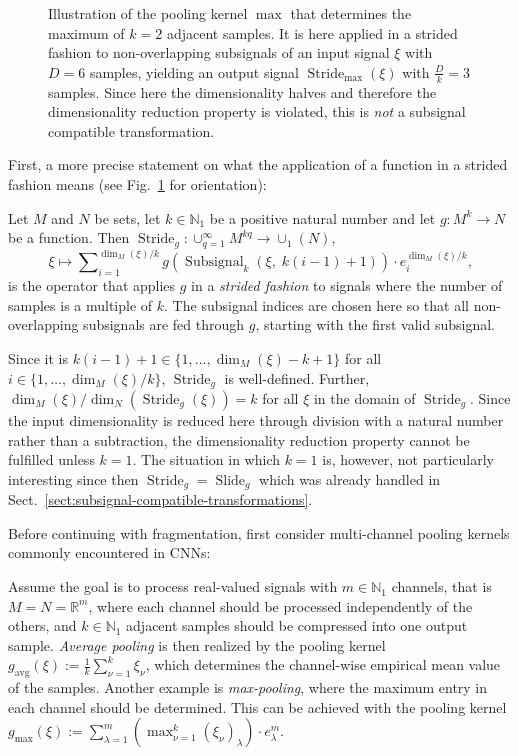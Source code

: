 \documentclass[journal]{IEEEtran}
\newcommand{\figurescalefactor}{0.995}
\newcommand{\N}{\mathbb{N}}
\newcommand{\R}{\mathbb{R}}
\newcommand{\discint}[2]{\{#1,\dotsc,#2\}}
\newcommand{\inint}[2]{\in\discint{#1}{#2}}
\DeclareMathOperator{\avg}{avg}
\DeclareMathOperator{\Subsignal}{Subsignal}
\DeclareMathOperator{\Slide}{Slide}
\DeclareMathOperator{\Stride}{Stride}
\begin{document}
\begin{figure}[t]
  \centering
  \scalebox{\figurescalefactor}{\texttt{[image: paper-pics.pdf]}}
  \caption{Illustration of the pooling kernel $\max$ that determines the maximum of $k = 2$ adjacent samples.
    It is here applied in a strided fashion to non-overlapping subsignals of an input signal $\xi$ with $D = 6$ samples, yielding an output signal $\Stride_{\max}(\xi)$ with $\frac{D}{k} = 3$ samples.
    Since here the dimensionality halves and therefore the dimensionality reduction property is violated, this is \emph{not} a subsignal compatible transformation.}
  \label{fig:strided-function}
\end{figure}

First, a more precise statement on what the application of a function in a strided fashion means (see Fig.~\ref{fig:strided-function} for orientation):
\begin{definition}
\label{def:strided-function}
Let $M$ and $N$ be sets, let $k\in\N_1$ be a positive natural number and let $g\colon M^k\to N$ be a function.
Then $\Stride_g\colon\cup_{q = 1}^\infty M^{kq}\to\cup_1(N)$,
\begin{displaymath}
  \xi\mapsto\sum\nolimits_{i = 1}^{\dim_M(\xi) / k} g(\Subsignal_k(\xi,\;k(i - 1) + 1))\cdot e_i^{\dim_M(\xi) / k}\text{,}
\end{displaymath}
is the operator that applies $g$ in a \emph{strided fashion} to signals where the number of samples is a multiple of $k$.
The subsignal indices are chosen here so that all non-overlapping subsignals are fed through $g$, starting with the first valid subsignal.
\end{definition}

Since it is $k(i - 1) + 1\inint{1}{\dim_M(\xi) - k + 1}$ for all $i\inint{1}{\dim_M(\xi) / k}$, $\Stride_g$ is well-defined.
Further, $\dim_M(\xi) / \dim_N(\Stride_g(\xi)) = k$ for all $\xi$ in the domain of $\Stride_g$.
Since the input dimensionality is reduced here through division with a natural number rather than a subtraction, the dimensionality reduction property cannot be fulfilled unless $k = 1$.
The situation in which $k = 1$ is, however, not particularly interesting since then $\Stride_g = \Slide_g$ which was already handled in Sect.~\ref{sect:subsignal-compatible-transformations}.

Before continuing with fragmentation, first consider multi-channel pooling kernels commonly encountered in CNNs:
\begin{example}
Assume the goal is to process real-valued signals with $m\in\N_1$ channels, that is $M = N = \R^m$, where each channel should be processed independently of the others, and $k\in\N_1$ adjacent samples should be compressed into one output sample.
\emph{Average pooling} is then realized by the pooling kernel $g_{\avg}(\xi) := \frac{1}{k}\sum_{\nu = 1}^k \xi_\nu$, which determines the channel-wise empirical mean value of the samples.
Another example is \emph{max-pooling}, where the maximum entry in each channel should be determined.
This can be achieved with the pooling kernel $g_{\max}(\xi) := \sum_{\lambda = 1}^m \left(\max_{\nu = 1}^k (\xi_\nu)_\lambda \right)\cdot e_\lambda^m$.
\end{example}
\end{document}
